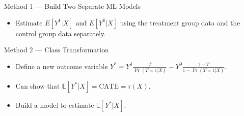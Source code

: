 \documentclass[20pt]{beamer}
\begin{document}
\begin{frame}{Method 1 --- Build Two Separate ML Models}

  \begin{itemize}
    \item Estimate $E[Y^1 | X]$ and $E[Y^0 | X]$ using the treatment group data and the control group data separately.
  \end{itemize}

\end{frame}



\begin{frame}{Method 2 --- Class Transformation}

  \begin{itemize}
    \item Define a new outcome variable $Y^* = Y^1 \frac{T}{\Pr(T=1 | X)} - Y^0 \frac{1-T}{1 - \Pr(T=1 | X)}$.

    \item Can show that $\mathbb{E}[Y^* | X] = \text{CATE} = \tau(X)$.

    \item Build a model to estimate $\mathbb{E}[Y^* | X]$.
  \end{itemize}


\end{frame}
\end{document}
